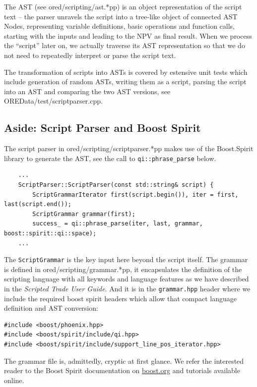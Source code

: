 \documentclass[12pt, a4paper]{report}
\begin{document}
The AST (see ored/scripting/ast.*pp) is an object representation of the script text -- the parser
unravels the script into a tree-like object of connected AST Nodes, representing variable definitions,
basic operations and function calls, starting with the inputs and leading to the NPV as final result.
When we process the ``script'' later on, we actually traverse its AST representation so that we do
not need to repeatedly interpret or parse the script text. 

The transformation of scripts into ASTs is covered by estensive unit tests which include
generation of random ASTs, writing them as a script, parsing the script into an AST and comparing the
two AST versions, see OREData/test/scriptparser.cpp.

\subsection{Aside: Script Parser and Boost Spirit}

The script parser in ored/scripting/scriptparser.*pp makes use of the Boost.Spirit library to
generate the AST, see the call to {\tt qi::phrase\_parse} below.

\begin{verbatim}
    ...
    ScriptParser::ScriptParser(const std::string& script) {
        ScriptGrammarIterator first(script.begin()), iter = first, last(script.end());
        ScriptGrammar grammar(first);
        success_ = qi::phrase_parse(iter, last, grammar, boost::spirit::qi::space);
    ...
\end{verbatim}

The {\tt ScriptGrammar} is the key input here beyond the script itself. The grammar is defined in
ored/scripting/grammar.*pp, it encapsulates the definition of the scripting
language with all keywords and language features as we have described in the {\em Scripted Trade User
  Guide}. And it is in the {\tt grammar.hpp} header where we include the required boost spirit headers
which allow that compact language definition and AST conversion:

\begin{verbatim}
#include <boost/phoenix.hpp>
#include <boost/spirit/include/qi.hpp>
#include <boost/spirit/include/support_line_pos_iterator.hpp>
\end{verbatim}

The grammar file is, admittedly, cryptic at first glance. We refer the interested
reader to the Boost Spirit documentation on \url{boost.org} and tutorials available online.
\end{document}
